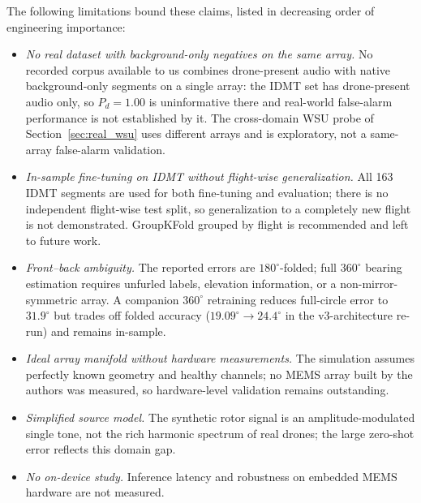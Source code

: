 \documentclass[sensors,article,submit,pdftex,moreauthors]{Definitions/mdpi}
\begin{document}
The following limitations bound these claims, listed in decreasing order of engineering importance:
\begin{itemize}
    \item \emph{No real dataset with background-only negatives on the same array.} No recorded corpus available to us combines drone-present audio with native background-only segments on a single array: the IDMT set has drone-present audio only, so $P_d=1.00$ is uninformative there and real-world false-alarm performance is not established by it. The cross-domain WSU probe of Section~\ref{sec:real_wsu} uses different arrays and is exploratory, not a same-array false-alarm validation.
    \item \emph{In-sample fine-tuning on IDMT without flight-wise generalization.} All 163 IDMT segments are used for both fine-tuning and evaluation; there is no independent flight-wise test split, so generalization to a completely new flight is not demonstrated. GroupKFold grouped by flight is recommended and left to future work.
    \item \emph{Front--back ambiguity.} The reported errors are $180^\circ$-folded; full $360^\circ$ bearing estimation requires unfurled labels, elevation information, or a non-mirror-symmetric array. A companion $360^\circ$ retraining reduces full-circle error to $31.9^\circ$ but trades off folded accuracy ($19.09^\circ\to24.4^\circ$ in the v3-architecture re-run) and remains in-sample.
    \item \emph{Ideal array manifold without hardware measurements.} The simulation assumes perfectly known geometry and healthy channels; no MEMS array built by the authors was measured, so hardware-level validation remains outstanding.
    \item \emph{Simplified source model.} The synthetic rotor signal is an amplitude-modulated single tone, not the rich harmonic spectrum of real drones; the large zero-shot error reflects this domain gap.
    \item \emph{No on-device study.} Inference latency and robustness on embedded MEMS hardware are not measured.
\end{itemize}
\end{document}
